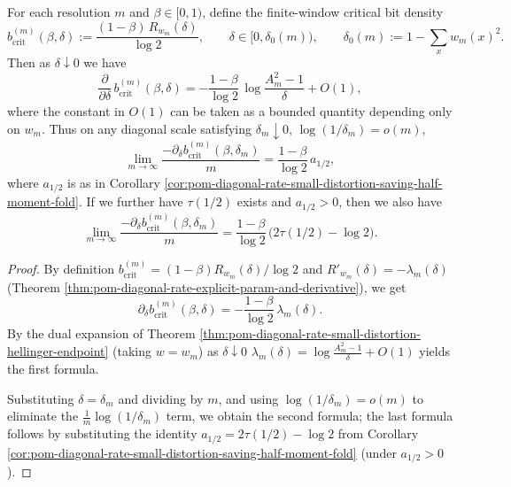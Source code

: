 \begin{corollary}[Endpoint Slope of the Critical Plane: Inverted from \texorpdfstring{$q=\tfrac12$}{q=1/2} Pressure]\label{cor:pom-query-distortion-critical-slope-inverts-half-pressure}
For each resolution \(m\) and \(\beta\in[0,1)\), define the finite-window critical bit density
\[
b_{\mathrm{crit}}^{(m)}(\beta,\delta):=\frac{(1-\beta)\,R_{w_m}(\delta)}{\log 2},\qquad \delta\in[0,\delta_0(m)),\qquad \delta_0(m):=1-\sum_x w_m(x)^2.
\]
Then as \(\delta\downarrow 0\) we have
\[
\frac{\partial}{\partial \delta}\,b_{\mathrm{crit}}^{(m)}(\beta,\delta)
=-\frac{1-\beta}{\log 2}\,\log\frac{A_m^2-1}{\delta}+O(1),
\]
where the constant in \(O(1)\) can be taken as a bounded quantity depending only on \(w_m\).
Thus on any diagonal scale satisfying \(\delta_m\downarrow 0\), \(\log(1/\delta_m)=o(m)\),
\[
\lim_{m\to\infty}\frac{-\partial_\delta b_{\mathrm{crit}}^{(m)}(\beta,\delta_m)}{m}
=\frac{1-\beta}{\log 2}\,a_{1/2},
\]
where \(a_{1/2}\) is as in Corollary \ref{cor:pom-diagonal-rate-small-distortion-saving-half-moment-fold}.
If we further have \(\tau(1/2)\) exists and \(a_{1/2}>0\), then we also have
\[
\lim_{m\to\infty}\frac{-\partial_\delta b_{\mathrm{crit}}^{(m)}(\beta,\delta_m)}{m}
=\frac{1-\beta}{\log 2}\,\bigl(2\tau(1/2)-\log 2\bigr).
\]
\end{corollary}
\begin{proof}
By definition \(b_{\mathrm{crit}}^{(m)}=(1-\beta)R_{w_m}(\delta)/\log 2\) and
\(
R'_{w_m}(\delta)=-\lambda_m(\delta)
\)
(Theorem \ref{thm:pom-diagonal-rate-explicit-param-and-derivative}), we get
\[
\partial_\delta b_{\mathrm{crit}}^{(m)}(\beta,\delta)
=-\frac{1-\beta}{\log 2}\,\lambda_m(\delta).
\]
By the dual expansion of Theorem \ref{thm:pom-diagonal-rate-small-distortion-hellinger-endpoint} (taking \(w=w_m\)) as \(\delta\downarrow 0\)
\(
\lambda_m(\delta)=\log\frac{A_m^2-1}{\delta}+O(1)
\)
yields the first formula.
\par
Substituting \(\delta=\delta_m\) and dividing by \(m\), and using \(\log(1/\delta_m)=o(m)\) to eliminate the \(\frac{1}{m}\log(1/\delta_m)\) term, we obtain the second formula;
the last formula follows by substituting the identity \(a_{1/2}=2\tau(1/2)-\log 2\) from Corollary \ref{cor:pom-diagonal-rate-small-distortion-saving-half-moment-fold} (under \(a_{1/2}>0\)).
\end{proof}

